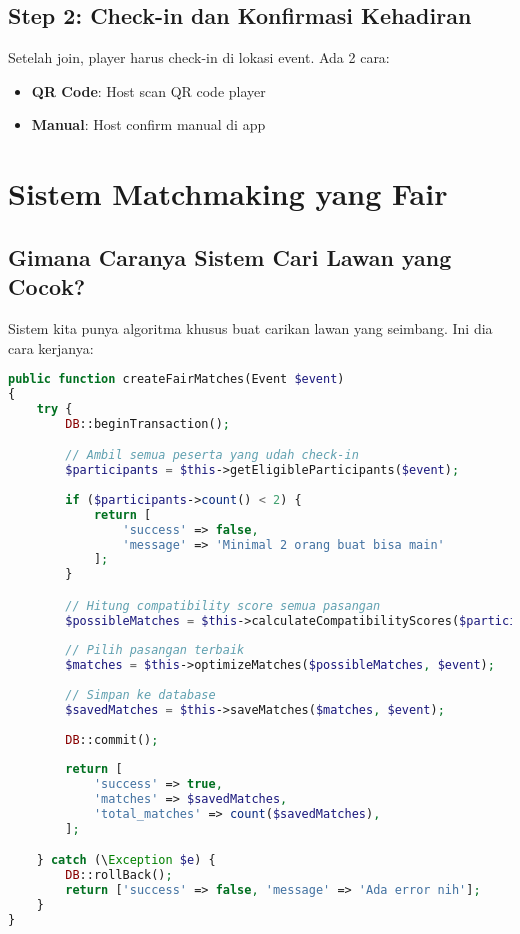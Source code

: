 \documentclass[12pt]{article}
\begin{document}
\subsection{Step 2: Check-in dan Konfirmasi Kehadiran}

Setelah join, player harus check-in di lokasi event. Ada 2 cara:
\begin{itemize}
    \item \textbf{QR Code}: Host scan QR code player
    \item \textbf{Manual}: Host confirm manual di app
\end{itemize}

\section{Sistem Matchmaking yang Fair}

\subsection{Gimana Caranya Sistem Cari Lawan yang Cocok?}

Sistem kita punya algoritma khusus buat carikan lawan yang seimbang. Ini dia cara kerjanya:

\begin{lstlisting}[language=PHP, caption=Algoritma Fair Matchmaking di MatchmakingService.php]
public function createFairMatches(Event $event)
{
    try {
        DB::beginTransaction();

        // Ambil semua peserta yang udah check-in
        $participants = $this->getEligibleParticipants($event);
        
        if ($participants->count() < 2) {
            return [
                'success' => false,
                'message' => 'Minimal 2 orang buat bisa main'
            ];
        }

        // Hitung compatibility score semua pasangan
        $possibleMatches = $this->calculateCompatibilityScores($participants, $event);
        
        // Pilih pasangan terbaik
        $matches = $this->optimizeMatches($possibleMatches, $event);
        
        // Simpan ke database
        $savedMatches = $this->saveMatches($matches, $event);
        
        DB::commit();
        
        return [
            'success' => true,
            'matches' => $savedMatches,
            'total_matches' => count($savedMatches),
        ];

    } catch (\Exception $e) {
        DB::rollBack();
        return ['success' => false, 'message' => 'Ada error nih'];
    }
}
\end{lstlisting}
\end{document}
